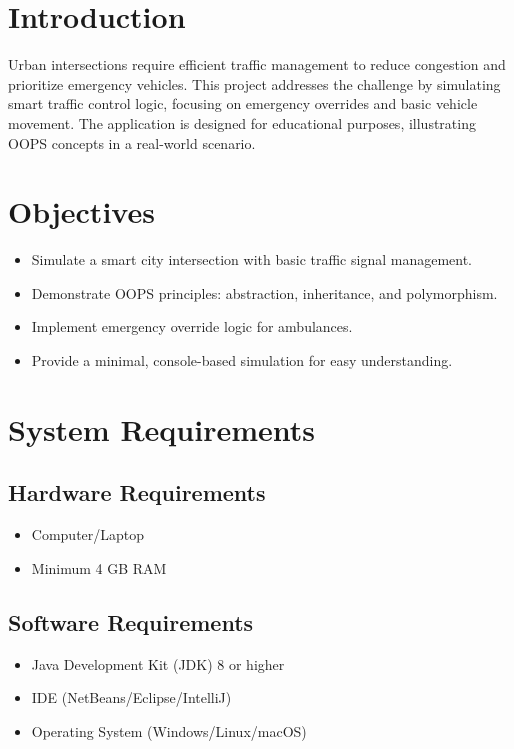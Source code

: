 \documentclass[12pt,a4paper]{article}
\begin{document}
\newpage

\section{Introduction}
Urban intersections require efficient traffic management to reduce congestion and prioritize emergency vehicles. This project addresses the challenge by simulating smart traffic control logic, focusing on emergency overrides and basic vehicle movement. The application is designed for educational purposes, illustrating OOPS concepts in a real-world scenario.

\section{Objectives}
\begin{itemize}
    \item Simulate a smart city intersection with basic traffic signal management.
    \item Demonstrate OOPS principles: abstraction, inheritance, and polymorphism.
    \item Implement emergency override logic for ambulances.
    \item Provide a minimal, console-based simulation for easy understanding.
\end{itemize}

\section{System Requirements}
\subsection{Hardware Requirements}
\begin{itemize}
    \item Computer/Laptop
    \item Minimum 4 GB RAM
\end{itemize}

\subsection{Software Requirements}
\begin{itemize}
    \item Java Development Kit (JDK) 8 or higher
    \item IDE (NetBeans/Eclipse/IntelliJ)
    \item Operating System (Windows/Linux/macOS)
\end{itemize}
\end{document}
